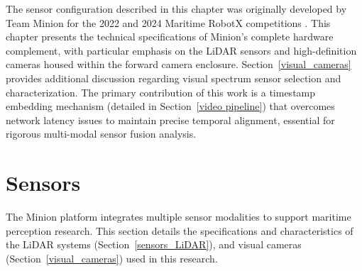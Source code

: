 \documentclass{erauthesis}
\begin{document}
The sensor configuration described in this chapter was originally developed by Team Minion for the 2022 and 2024 Maritime RobotX competitions \cite{holland2024, thompson2023}. This chapter presents the technical specifications of Minion's complete hardware complement, with particular emphasis on the \ac{LiDAR} sensors and high-definition cameras housed within the forward camera enclosure. Section~\ref{visual_cameras} provides additional discussion regarding visual spectrum sensor selection and characterization. The primary contribution of this work is a timestamp embedding mechanism (detailed in Section~\ref{video pipeline}) that overcomes network latency issues to maintain precise temporal alignment, essential for rigorous multi-modal sensor fusion analysis.
        
\section{Sensors} \label{sensors}

The Minion platform integrates multiple sensor modalities to support maritime perception research.
This section details the specifications and characteristics of the \ac{LiDAR} systems (Section~\ref{sensors_LiDAR}), and visual cameras (Section~\ref{visual_cameras}) used in this research.





\end{document}
